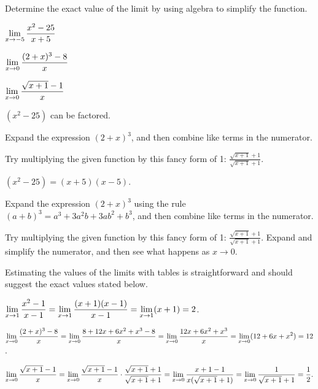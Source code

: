\begin{activity} \label{A:1.1.2}  Determine the exact value of the limit by using algebra to simplify the function. 
\ba
		\item $\displaystyle \lim_{x \to -5} \frac{x^2 - 25}{x+5}$
		\item $\displaystyle \lim_{x \to 0} \frac{(2+x)^3 - 8}{x}$
		\item $\displaystyle \lim_{x \to 0} \frac{\sqrt{x+1} - 1}{x}$
\ea
\end{activity}
\begin{smallhint}
\ba
	\item $(x^2 - 25)$ can be factored.
	\item Expand the expression $(2+x)^3$, and then combine like terms in the numerator.
	\item Try multiplying the given function by this fancy form of 1: $\frac{\sqrt{x+1} + 1}{\sqrt{x+1} + 1}$.
\ea
\end{smallhint}
\begin{bighint}
\ba
	\item $(x^2 - 25) = (x+5)(x-5)$.
	\item Expand the expression $(2+x)^3$ using the rule $(a+b)^3 = a^3 + 3a^2b + 3ab^2 + b^3$, and then combine like terms in the numerator.
	\item Try multiplying the given function by this fancy form of 1: $\frac{\sqrt{x+1} + 1}{\sqrt{x+1} + 1}$.  Expand and simplify the numerator, and then see what happens as $x \to 0$.
\ea
\end{bighint}
\begin{activitySolution}
Estimating the values of the limits with tables is straightforward and should suggest the exact values stated below.
\ba
	\item $\displaystyle \lim_{x \to 1} \frac{x^2 - 1}{x-1} = \lim_{x \to 1} \frac{(x+1)(x-1)}{x-1} = \lim_{x \to 1} (x+1) = 2$. 
	\item $\displaystyle \lim_{x \to 0} \frac{(2+x)^3 - 8}{x} = \lim_{x \to 0} \frac{8 + 12x + 6x^2 + x^3 - 8}{x} = \lim_{x \to 0} \frac{12x + 6x^2 + x^3}{x} =  \lim_{x \to 0} (12 + 6x + x^2) = 12$.
	\item $\displaystyle \lim_{x \to 0} \frac{\sqrt{x+1} - 1}{x} = \lim_{x \to 0} \frac{\sqrt{x+1} - 1}{x} \cdot \frac{\sqrt{x+1} + 1}{\sqrt{x+1} + 1} = \lim_{x \to 0} \frac{x+1-1}{x(\sqrt{x+1}+1)} = \lim_{x \to 0} \frac{1}{\sqrt{x+1}+1} = \frac{1}{2}.$
\ea
\end{activitySolution}
\aftera
